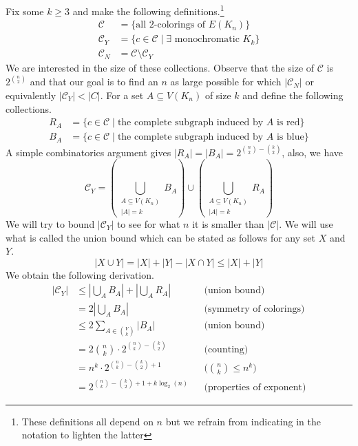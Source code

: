 \documentclass{tufte-handout}
\newcommand{\bra}[1]{\left(#1\right)}
\theoremstyle{definition}
\theoremstyle{remark}
\begin{document}
Fix some $k\geq 3$ and make the following definitions.\footnote{These definitions all depend on $n$ but we refrain from indicating in the notation to lighten the latter}
\begin{align*}
	\mathcal{C} &= \{ \mbox{all $2$-colorings of $E(K_n)$} \}\\
	\mathcal{C}_Y &= \{ c \in \mathcal{C} \mid \exists \mbox{ monochromatic } K_k \}\\
	\mathcal{C}_N &= \mathcal{C}\setminus \mathcal{C}_Y
\end{align*}
We are interested in the size of these collections. Observe that the size of $\mathcal{C}$ is $2^{\binom{n}{2}}$ and that our goal is to find an $n$ as large possible for which $|\mathcal{C}_N|$ or equivalently $|\mathcal{C}_Y| < |C|$. For a set $A \subseteq V(K_n)$ of size $k$ and define the following collections.
\begin{align*}
	R_A &= \{ c \in \mathcal{C} \mid \mbox{the complete subgraph induced by $A$ is red} \}\\
	B_A &= \{ c \in \mathcal{C} \mid \mbox{the complete subgraph induced by $A$ is blue} \}
\end{align*}
A simple combinatorics argument gives $|R_A| = |B_A| = 2^{\binom{n}{2} - \binom{k}{2}}$, also, we have 
\[ \mathcal{C}_Y = \bra{\bigcup_{\substack{A \subseteq V(K_n)\\|A| = k}} B_A} \cup \bra{\bigcup_{\substack{A \subseteq V(K_n)\\|A| = k}} R_A} \]
We will try to bound $|\mathcal{C}_Y|$ to see for what $n$ it is smaller than $|\mathcal{C}|$. We will use what is called the union bound which can be stated as follows for any set $X$ and $Y$.
\[|X \cup Y| = |X| +|Y| - |X \cap Y| \leq |X| + |Y| \]
We obtain the following derivation.
\begin{align*}
	|\mathcal{C}_Y| &\leq \left|\bigcup_{A}B_A\right| + \left|\bigcup_{A}R_A\right|&&\mbox{(union bound)}\\
	&= 2\left|\bigcup_{A}B_A\right|&&\mbox{(symmetry of colorings)}\\
	&\leq 2\sum_{A \in \binom{V}{k}} |B_A| &&\mbox{(union bound)}\\
	&= 2\binom{n}{k} \cdot 2^{\binom{n}{k}-\binom{k}{2}}&&\mbox{(counting)}\\
	&= n^k \cdot 2^{\binom{n}{k}-\binom{k}{2} + 1}&&\mbox{($\binom{n}{k} \leq n^k$)}\\
	&= 2^{\binom{n}{k}-\binom{k}{2} + 1 + k\log_2(n)}&&\mbox{(properties of exponent)}
\end{align*}
\end{document}
